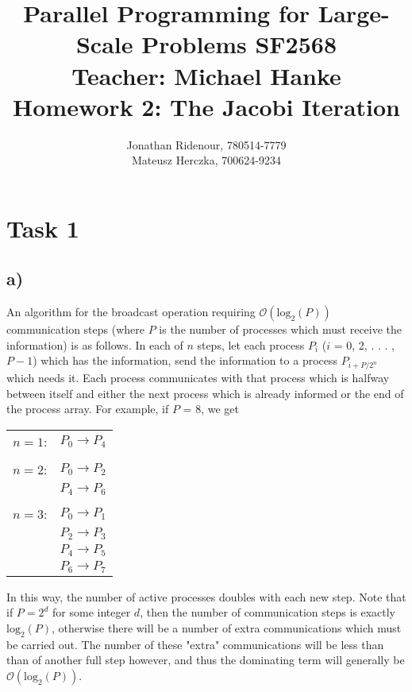\documentclass[a4paper,11pt]{article}
\title{Parallel Programming for Large-Scale Problems SF2568 \\
Teacher: Michael Hanke \\
Homework 2: The Jacobi Iteration}
\author{Jonathan Ridenour, 780514-7779\\
Mateusz Herczka, 700624-9234}
\begin{document}

\maketitle
\pagebreak
\section*{Task 1}
\subsection*{a)}
An algorithm for the broadcast operation requiring $\mathcal{O}(\text{log}_2(P))$ communication steps (where $P$ is the number of processes which must receive the information) is as follows.    In each of $n$ steps, let each process $P_i$ ($i$ = 0, 2, . . . , $P-1$) which has the information, send the information to a process $P_{i+P/2^n}$ which needs it.  Each process communicates with that process which is halfway between itself and either the next process which is already informed or the end of the process array.  For example, if $P$ = 8, we get
\begin{center}
\begin{tabular}{l r}
 $n=1$: & $P_0 \rightarrow P_4$ \\\\
 $n=2$: & $P_0 \rightarrow P_2$ \\
	 & $P_4 \rightarrow P_6$\\\\
 $n=3$: & $P_0 \rightarrow P_1$ \\
	 & $P_2 \rightarrow P_3$\\
	 & $P_4 \rightarrow P_5$\\
	 & $P_6 \rightarrow P_7$
\end{tabular}
\end{center}
In this way, the number of active processes doubles with each new step.  Note that if $P = 2^d$ for some integer $d$, then the number of communication steps is exactly $\text{log}_2(P)$, otherwise there will be a number of extra communications which must be carried out.  The number of these "extra" communications will be less than than of another full step however, and thus the dominating term will generally be $\mathcal{O}(\text{log}_2(P))$.
\end{document}

